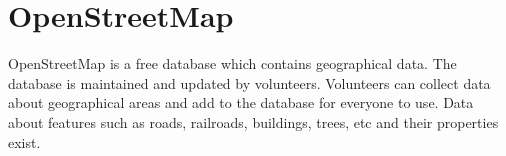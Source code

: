\section{OpenStreetMap}
    OpenStreetMap is a free database which contains geographical data. The database is maintained and updated by volunteers. Volunteers can collect data about geographical areas and add to the database for everyone to use. Data about features such as roads, railroads, buildings, trees, etc and their properties exist. 